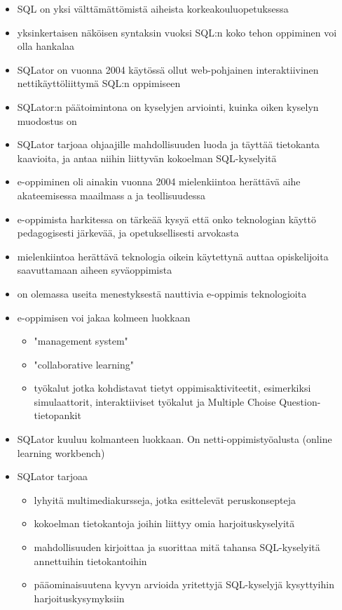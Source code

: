 \documentclass[finnish,twoside,openright]{HYgraduMLDS}
\begin{document}
\begin{itemize}
    \item SQL on yksi välttämättömistä aiheista korkeakouluopetuksessa
    \item yksinkertaisen näköisen syntaksin vuoksi SQL:n koko tehon oppiminen voi olla hankalaa
    \item SQLator on vuonna 2004 käytössä ollut web-pohjainen interaktiivinen nettikäyttöliittymä SQL:n oppimiseen
    \item SQLator:n päätoimintona on kyselyjen arviointi, kuinka oiken kyselyn muodostus on
    \item SQLator tarjoaa ohjaajille mahdollisuuden luoda ja täyttää tietokanta kaavioita, ja antaa niihin liittyvän kokoelman SQL-kyselyitä
    \item e-oppiminen oli ainakin vuonna 2004 mielenkiintoa herättävä aihe akateemisessa maailmass a ja teollisuudessa
    \item e-oppimista harkitessa on tärkeää kysyä että onko teknologian käyttö pedagogisesti järkevää, ja opetuksellisesti arvokasta
    \item mielenkiintoa herättävä teknologia oikein käytettynä auttaa opiskelijoita saavuttamaan aiheen syväoppimista
    \item on olemassa useita menestyksestä nauttivia e-oppimis teknologioita
    \item e-oppimisen voi jakaa kolmeen luokkaan
    \begin{itemize}
        \item "management system"
        \item "collaborative learning"
        \item työkalut jotka kohdistavat tietyt oppimisaktiviteetit, esimerkiksi simulaattorit, interaktiiviset työkalut ja Multiple Choise Question-tietopankit
    \end{itemize}
    \item SQLator kuuluu kolmanteen luokkaan. On netti-oppimistyöalusta (online learning workbench)
    \item SQLator tarjoaa
    \begin{itemize}
        \item lyhyitä multimediakursseja, jotka esittelevät peruskonsepteja
        \item kokoelman tietokantoja joihin liittyy omia harjoituskyselyitä
        \item mahdollisuuden kirjoittaa ja suorittaa mitä tahansa SQL-kyselyitä annettuihin tietokantoihin
        \item pääominaisuutena kyvyn arvioida yritettyjä SQL-kyselyjä kysyttyihin harjoituskysymyksiin

\end{itemize}
\end{itemize}
\end{document}
